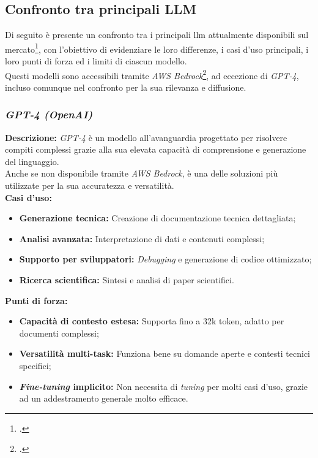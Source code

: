 \subsection{Confronto tra principali LLM}
\label{subsec:llm-confronto}

Di seguito è presente un confronto tra i principali \gls{llm} attualmente disponibili sul mercato\footcite{site:key-differences-llm}, con l'obiettivo di evidenziare le loro differenze, i casi d'uso principali, i loro punti di forza ed i limiti di ciascun modello.\\
Questi modelli sono accessibili tramite \textit{AWS Bedrock}\footcite{site:aws-bedrock}, ad eccezione di \textit{GPT-4}, incluso comunque nel confronto per la sua rilevanza e diffusione.

\subsubsection{\textit{GPT-4 (OpenAI)}}

\noindent \textbf{Descrizione:}
\textit{GPT-4} è un modello all’avanguardia progettato per risolvere compiti complessi grazie alla sua elevata capacità di comprensione e generazione del linguaggio. \\
Anche se non disponibile tramite \textit{AWS Bedrock}, è una delle soluzioni più utilizzate per la sua accuratezza e versatilità.\\

\noindent \textbf{Casi d’uso:}
\begin{itemize}
   \item \textbf{Generazione tecnica:} Creazione di documentazione tecnica dettagliata;
   \item \textbf{Analisi avanzata:} Interpretazione di dati e contenuti complessi;
   \item \textbf{Supporto per sviluppatori:} \textit{Debugging} e generazione di codice ottimizzato;
   \item \textbf{Ricerca scientifica:} Sintesi e analisi di paper scientifici.
\end{itemize}

\noindent \textbf{Punti di forza:}
\begin{itemize}
    \item \textbf{Capacità di contesto estesa:} Supporta fino a 32k \gls{token}, adatto per documenti complessi;
    \item \textbf{Versatilità multi-task:} Funziona bene su domande aperte e contesti tecnici specifici;
    \item \textbf{\textit{Fine-tuning} implicito:} Non necessita di \textit{tuning} per molti casi d’uso, grazie ad un addestramento generale molto efficace.
\end{itemize}

